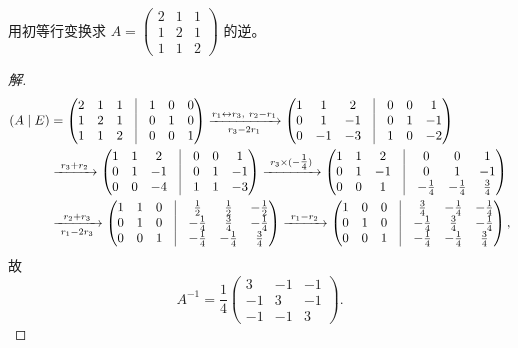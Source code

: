 \begin{example}\label{ex:inv-elementary}
用初等行变换求
$A=\begin{pmatrix} 2 & 1 & 1 \\ 1 & 2 & 1 \\ 1 & 1 & 2 \end{pmatrix}$ 的逆。
\end{example}
\begin{proof}[解]
\begin{align*}
  (A\mid E)
  &=\begin{pmatrix} 2 & 1 & 1 &\vline& 1 & 0 & 0 \\
                    1 & 2 & 1 &\vline& 0 & 1 & 0 \\
                    1 & 1 & 2 &\vline& 0 & 0 & 1 \end{pmatrix}
   \xrightarrow[\ r_3-2r_1\ ]{r_1\leftrightarrow r_3,\ r_2-r_1}
    \begin{pmatrix} 1 & 1 & 2 &\vline& 0 & 0 & 1 \\
                    0 & 1 & -1 &\vline& 0 & 1 & -1 \\
                    0 & -1 & -3 &\vline& 1 & 0 & -2 \end{pmatrix} \\
  &\xrightarrow{\ r_3+r_2\ }
    \begin{pmatrix} 1 & 1 & 2 &\vline& 0 & 0 & 1 \\
                    0 & 1 & -1 &\vline& 0 & 1 & -1 \\
                    0 & 0 & -4 &\vline& 1 & 1 & -3 \end{pmatrix}
   \xrightarrow{\ r_3\times(-\tfrac14)\ }
    \begin{pmatrix} 1 & 1 & 2 &\vline& 0 & 0 & 1 \\
                    0 & 1 & -1 &\vline& 0 & 1 & -1 \\
                    0 & 0 & 1 &\vline& -\tfrac14 & -\tfrac14 & \tfrac34 \end{pmatrix} \\
  &\xrightarrow[\ r_1-2r_3\ ]{r_2+r_3}
    \begin{pmatrix} 1 & 1 & 0 &\vline& \tfrac12 & \tfrac12 & -\tfrac12 \\
                    0 & 1 & 0 &\vline& -\tfrac14 & \tfrac34 & -\tfrac14 \\
                    0 & 0 & 1 &\vline& -\tfrac14 & -\tfrac14 & \tfrac34 \end{pmatrix}
   \xrightarrow{\ r_1-r_2\ }
    \begin{pmatrix} 1 & 0 & 0 &\vline& \tfrac34 & -\tfrac14 & -\tfrac14 \\
                    0 & 1 & 0 &\vline& -\tfrac14 & \tfrac34 & -\tfrac14 \\
                    0 & 0 & 1 &\vline& -\tfrac14 & -\tfrac14 & \tfrac34 \end{pmatrix},
\end{align*}
故
\[
  A^{-1}=\frac14\begin{pmatrix} 3 & -1 & -1 \\ -1 & 3 & -1 \\ -1 & -1 & 3 \end{pmatrix}.
\]
\end{proof}

